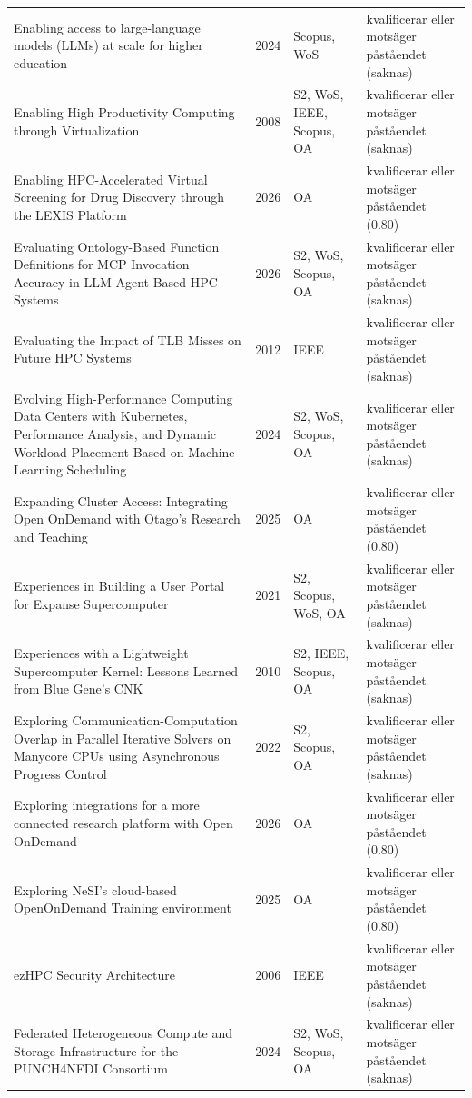 \begin{longtable}{@{}%
  >{\raggedright\arraybackslash}p{}c%
  >{\raggedright\arraybackslash}p{}%
  >{\raggedright\arraybackslash}p{}@{}}
Enabling access to large-language models (LLMs) at scale for higher education & 2024 & Scopus, WoS & kvalificerar eller motsäger påståendet (saknas) \\
Enabling High Productivity Computing through Virtualization & 2008 & S2, WoS, IEEE, Scopus, OA & kvalificerar eller motsäger påståendet (saknas) \\
Enabling HPC-Accelerated Virtual Screening for Drug Discovery through the LEXIS Platform & 2026 & OA & kvalificerar eller motsäger påståendet (0.80) \\
Evaluating Ontology-Based Function Definitions for MCP Invocation Accuracy in LLM Agent-Based HPC Systems & 2026 & S2, WoS, Scopus, OA & kvalificerar eller motsäger påståendet (saknas) \\
Evaluating the Impact of TLB Misses on Future HPC Systems & 2012 & IEEE & kvalificerar eller motsäger påståendet (saknas) \\
Evolving High-Performance Computing Data Centers with Kubernetes, Performance Analysis, and Dynamic Workload Placement Based on Machine Learning Scheduling & 2024 & S2, WoS, Scopus, OA & kvalificerar eller motsäger påståendet (saknas) \\
Expanding Cluster Access: Integrating Open OnDemand with Otago's Research and Teaching & 2025 & OA & kvalificerar eller motsäger påståendet (0.80) \\
Experiences in Building a User Portal for Expanse Supercomputer & 2021 & S2, Scopus, WoS, OA & kvalificerar eller motsäger påståendet (saknas) \\
Experiences with a Lightweight Supercomputer Kernel: Lessons Learned from Blue Gene's CNK & 2010 & S2, IEEE, Scopus, OA & kvalificerar eller motsäger påståendet (saknas) \\
Exploring Communication-Computation Overlap in Parallel Iterative Solvers on Manycore CPUs using Asynchronous Progress Control & 2022 & S2, Scopus, OA & kvalificerar eller motsäger påståendet (saknas) \\
Exploring integrations for a more connected research platform with Open OnDemand & 2026 & OA & kvalificerar eller motsäger påståendet (0.80) \\
Exploring NeSI's cloud-based OpenOnDemand Training environment & 2025 & OA & kvalificerar eller motsäger påståendet (0.80) \\
ezHPC Security Architecture & 2006 & IEEE & kvalificerar eller motsäger påståendet (saknas) \\
Federated Heterogeneous Compute and Storage Infrastructure for the PUNCH4NFDI Consortium & 2024 & S2, WoS, Scopus, OA & kvalificerar eller motsäger påståendet (saknas) \\

\end{longtable}
